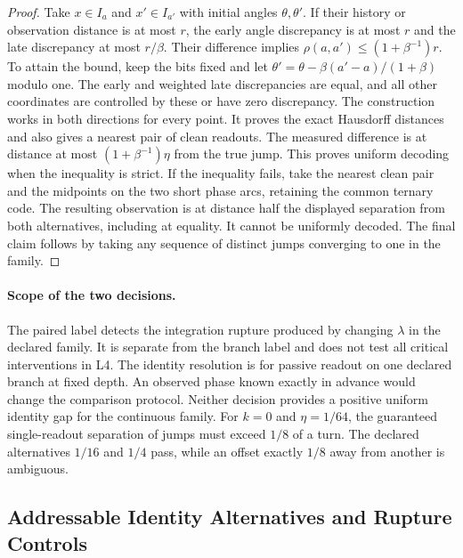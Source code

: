 \documentclass[11pt,a4paper]{article}
\theoremstyle{definition}
\begin{document}
\begin{proof}
Take $x\in I_a$ and $x'\in I_{a'}$ with initial angles $\theta,\theta'$. If their history or observation distance is at most $r$, the early angle discrepancy is at most $r$ and the late discrepancy at most $r/\beta$. Their difference implies $\rho(a,a')\le(1+\beta^{-1})r$. To attain the bound, keep the bits fixed and let $\theta'=\theta-\beta(a'-a)/(1+\beta)$ modulo one. The early and weighted late discrepancies are equal, and all other coordinates are controlled by these or have zero discrepancy. The construction works in both directions for every point. It proves the exact Hausdorff distances and also gives a nearest pair of clean readouts. The measured difference is at distance at most $(1+\beta^{-1})\eta$ from the true jump. This proves uniform decoding when the inequality is strict. If the inequality fails, take the nearest clean pair and the midpoints on the two short phase arcs, retaining the common ternary code. The resulting observation is at distance half the displayed separation from both alternatives, including at equality. It cannot be uniformly decoded. The final claim follows by taking any sequence of distinct jumps converging to one in the family.
\end{proof}

\paragraph{Scope of the two decisions.}
The paired label detects the integration rupture produced by changing $\lambda$ in the declared family. It is separate from the branch label and does not test all critical interventions in L4. The identity resolution is for passive readout on one declared branch at fixed depth. An observed phase known exactly in advance would change the comparison protocol. Neither decision provides a positive uniform identity gap for the continuous family. For $k=0$ and $\eta=1/64$, the guaranteed single-readout separation of jumps must exceed $1/8$ of a turn. The declared alternatives $1/16$ and $1/4$ pass, while an offset exactly $1/8$ away from another is ambiguous.


\subsection{Addressable Identity Alternatives and Rupture Controls}
\end{document}
